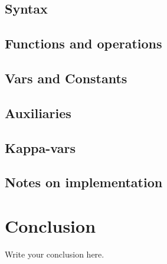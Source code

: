 \documentclass{article}
\begin{document}
\subsection{Syntax}
\subsection{Functions and operations}
\subsection{Vars and Constants}
\subsection{Auxiliaries}
\subsection{Kappa-vars}
\subsection{Notes on implementation}

\section{Conclusion}
Write your conclusion here.
\end{document}
